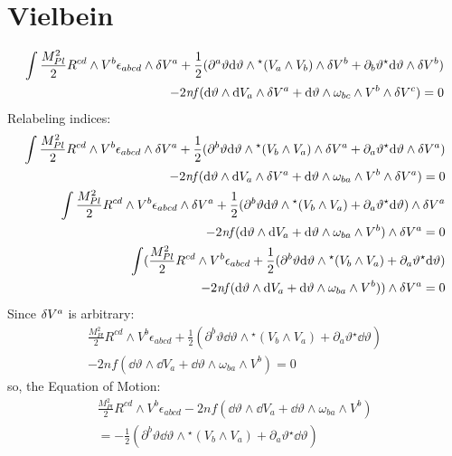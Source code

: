 \documentclass[12pt]{article}
\newcommand{\hodge}{{^\star}}
\begin{document}
\section{Vielbein}
\begin{align*}
  \int \frac{M_{Pl}^2}{2}R^{cd} \wedge V^b \epsilon_{abcd} \wedge \var V^a + \frac{1}{2}(\partial^a\vartheta \dd\vartheta \wedge \hodge(V_a \wedge V_b) \wedge \var{V^b} + \partial_b\vartheta \hodge\dd\vartheta \wedge \var{V^b}) \\ - 2\mathit{nf}(\dd\vartheta \wedge \dd V_a \wedge \var{V^a} + \dd\vartheta \wedge \omega_{bc} \wedge V^b \wedge \var{V^c}) = 0
\end{align*}
Relabeling indices:
\begin{align*}
  \int \frac{M_{Pl}^2}{2}R^{cd} \wedge V^b \epsilon_{abcd} \wedge \var V^a + \frac{1}{2}(\partial^b\vartheta \dd\vartheta \wedge \hodge(V_b \wedge V_a) \wedge \var{V^a} + \partial_a\vartheta \hodge\dd\vartheta \wedge \var{V^a}) \\ - 2\mathit{nf}(\dd\vartheta \wedge \dd V_a \wedge \var{V^a} + \dd\vartheta \wedge \omega_{ba} \wedge V^b \wedge \var{V^a}) = 0 \\
  \int \frac{M_{Pl}^2}{2}R^{cd} \wedge V^b \epsilon_{abcd} \wedge \var V^a + \frac{1}{2}(\partial^b\vartheta \dd\vartheta \wedge \hodge(V_b \wedge V_a) + \partial_a\vartheta \hodge\dd\vartheta) \wedge \var{V^a} \\ - 2\mathit{nf}(\dd\vartheta \wedge \dd V_a + \dd\vartheta \wedge \omega_{ba} \wedge V^b) \wedge \var{V^a} = 0 \\
  \int (\frac{M_{Pl}^2}{2}R^{cd} \wedge V^b \epsilon_{abcd} + \frac{1}{2}(\partial^b\vartheta \dd\vartheta \wedge \hodge(V_b \wedge V_a) + \partial_a\vartheta \hodge\dd\vartheta) \\ - 2\mathit{nf}(\dd\vartheta \wedge \dd V_a + \dd\vartheta \wedge \omega_{ba} \wedge V^b)) \wedge \var{V^a} = 0 \\
\end{align*}
Since $\var{V^a}$ is arbitrary:
\begin{align}
  \frac{M_{Pl}^2}{2}R^{cd} \wedge V^b \epsilon_{abcd} + \frac{1}{2}(\partial^b\vartheta \dd\vartheta \wedge \hodge(V_b \wedge V_a) + \partial_a\vartheta \hodge\dd\vartheta) \nonumber \\ - 2\mathit{nf}(\dd\vartheta \wedge \dd V_a + \dd\vartheta \wedge \omega_{ba} \wedge V^b) = 0
\end{align}
so, the Equation of Motion:
\begin{align}
  \frac{M_{Pl}^2}{2}R^{cd} \wedge V^b \epsilon_{abcd} - 2\mathit{nf}(\dd\vartheta \wedge \dd V_a + \dd\vartheta \wedge \omega_{ba} \wedge V^b) \nonumber \\ = - \frac{1}{2}(\partial^b\vartheta \dd\vartheta \wedge \hodge(V_b \wedge V_a) + \partial_a\vartheta \hodge\dd\vartheta)
\end{align}
\end{document}
